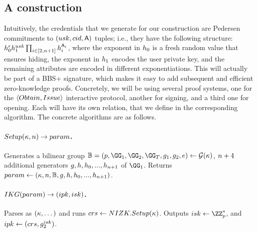


\subsection{A \GSAC construction}
\label{ssec:construction-gsac}

Intuitively, the credentials that we generate for our \GSAC construction are
Pedersen commitments to $(usk,cid,\mathsf{A})$ tuples; i.e., they have
the following structure: $h_0^rh_1^{usk}\prod_{i \in [2,n+1]}
h_i^{\mathsf{A}_i}$, where the exponent in $h_0$ is a fresh random value
that ensures hiding, the exponent in $h_1$ encodes the user private
key, and the remaining attributes are encoded in different
exponentiations. This will actually be part of a BBS+ signature, which makes it
easy to add subsequent and efficient zero-knowledge proofs. Concretely, we will
be using several \NIZK proof systems, one for the $\langle Obtain,Issue
\rangle$ interactive protocol, another for signing, and a third one for opening.
Each will have its own relation, that we define in the corresponding algorithm.
The concrete algorithms are as follows.

\paragraph{$Setup(\kappa,n) \rightarrow param$.} %
Generates a bilinear group $\BB = (p,\GG_1,\GG_2,\GG_T,\gen{g}_1,\gen{g}_2,e) \gets
\PGen(\secpar)$, $n+4$ additional generators $g,h,h_0,...,
h_{n+1}$ of $\GG_1$. Returns $param \gets
(\kappa,n,\mathbb{B},g,h,h_0,...,h_{n+1})$.

\paragraph{$IKG(param) \rightarrow (ipk,isk)$.} %
Parses \parm as $(\kappa,\dots)$ and runs $crs \gets NIZK.Setup(\kappa)$.
Outputs $\isk \gets \ZZ^*_p$, and $ipk \gets (crs,g_2^{isk})$.

